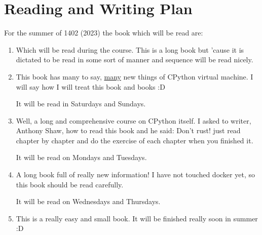 			
		
		\clearpage
		\section{Reading and Writing Plan}
			\noindent For the summer of 1402 (2023) the book which will be read are:
			\begin{enumerate}
				\item {}
				
				Which will be read during the  course. This is a long book but 'cause it is dictated to be read in some sort of manner and sequence will be read nicely.
				
				\item {}
				
				This book has many to say, \underline{many} new things of CPython virtual machine. I will say how I will treat this book and  books :D
				
				It will be read in Saturdays and Sundays.
				
				\item {}
				
				Well, a long and comprehensive course on CPython itself. I asked to writer, Anthony Shaw, how to read this book and he said: Don't rust! just read chapter by chapter and do the exercise of each chapter when  you finished it.
				
				It will be read on Mondays and Tuesdays.
				
				\item {}
				
				A long book full of really new information! I have not touched docker yet, so this book should be read carefully.
				
				It will be read on Wednesdays and Thursdays.
				
				\item {}
				
				This is a really easy and small book. It will be finished really soon in summer :D
			\end{enumerate}
			
